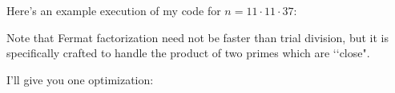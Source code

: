 Here's an example execution of my code
for $n = 11 \cdot 11 \cdot 37$:

Note that Fermat factorization need not be faster than trial division,
but it is specifically crafted to handle the product of two primes which are
\lq\lq close".

I'll give you one optimization:









\begin{comment}
  Square check:

  n^2 \equiv 0,1 (4)               --> 50%
  n^2 \equiv 0,1,4 (8)             --> 3/8 = 37.5%
  n^2 \equiv 0,1,4,9 (16)          --> 4/16 = 25%
  n^2 \equiv 0,1,4,9,16,17,25 (32) --> 7/32 = 21.8%

  Therefore is 1st 5 bits not 00000 or 00100 or *0001 or *1001, n is not square
  
  x^2 - n ... find first z^2     ---> z^2 <= x^2 - n
  (x+1)^2-n = x^2 - n + 2*x + 1, (z+1)^2 = z^2 + 2z + 1 ---> (z+1)^2 <= (x+1)^2 - n

  x^2 - n increase by 2x + 1
  z^2     increase by 2z + 1
  DIFF = 2(z - x)
  
  DELTA = (x^2 - n) - z^2.


  x^2 -> (x+1)^2 = x^2 + 2x + 1
  For k steps:
  (x+k)^2 = x^2 + 2kx + 1
  Find best k.
  
\end{comment}



\begin{comment}
  It would terminate when $x = (p + 1)/2$ and $y = (p - 1)/2$
  so that $x - y = 1$, $x + y = p$, i.e., we get the factorization $n = 1 \times n$.

  In this case $x$ starts at around $\sqrt{p} + 1$ and reaches $(p + 1)/2$,
  roughly from $\sqrt{p}$ to $p/2$.
  For instance if $p$ is about $10000$, then $p$ runs from $100$ to $5000$, i.e.,
  $4900$ integers.
  Brute force test for primeness runs from $2$ to $\sqrt{p}$ which in this case if $2$ to $100$.
  Therefore Fermat Factorization would be a very bad prime testing algorithm.
\end{comment}








